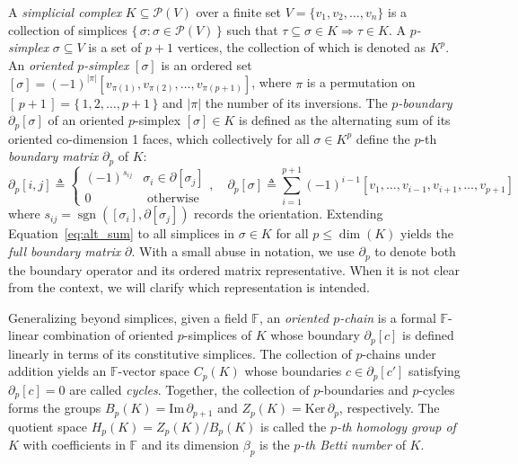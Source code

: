 \documentclass[pdflatex,sn-mathphys-num]{sn-jnl}
\begin{document}
A \emph{simplicial complex} \(K \subseteq \mathcal{P}(V)\) over a finite set \(V = \{ v_{1},v_{2},\ldots,v_{n}\}\) is a collection of simplices \(\{\,\sigma:\sigma \in \mathcal{P}(V)\,\}\) such that \(\tau \subseteq \sigma \in K \Rightarrow \tau \in K\). A \emph{\(p\)-simplex} \(\sigma \subseteq V\) is a set of \(p + 1\) vertices, the collection of which is denoted as \(K^{p}\). An \emph{oriented \(p\)-simplex} \( [\sigma] \) is an ordered set \( [\sigma]  = ( - 1)^{|\pi|} \left[ v_{\pi(1)},v_{\pi(2)},\ldots,v_{\pi(p + 1)} \right] \), where \(\pi\) is a permutation on \( [\, p + 1\,]  = \{\, 1,2,\ldots,p + 1\,\}\) and \(|\pi|\) the number of its inversions. The \emph{\(p\)-boundary} \(\partial_{p} [\sigma] \) of an oriented \(p\)-simplex \( [\sigma]  \in K\) is defined as the alternating sum of its oriented co-dimension 1 faces, which collectively for all \(\sigma \in K^{p}\) define the \(p\)-th \emph{boundary matrix} \(\partial_{p}\) of \(K\):
\begin{equation}
\partial_p[i, j] \triangleq 
\begin{cases}
(-1)^{s_{i j}} & \sigma_i \in \partial\left[\sigma_j\right] \\
0 & \text { otherwise }
\end{cases}, 
\quad \partial_p[\sigma] \triangleq \sum_{i=1}^{p+1}(-1)^{i-1} [v_1, \dots, v_{i-1}, v_{i+1}, \dots, v_{p+1}]
\end{equation}\label{eq:alt_sum}
\noindent
where \(s_{ij} = \operatorname{sgn} \left(  \left[ \sigma_{i} \right] ,\partial \left[ \sigma_{j} \right]  \right) \) records the orientation. Extending Equation~\ref{eq:alt_sum} to all simplices in \(\sigma \in K\) for all \(p \leq \dim(K)\) yields the \emph{full boundary matrix} \(\partial\). With a small abuse in notation, we use \(\partial_{p}\) to denote both the boundary operator and its ordered matrix representative. When it is not clear from the context, we will clarify which representation is intended.

Generalizing beyond simplices, given a field \(\mathbb{F}\), an \emph{oriented \(p\)-chain} is a formal \(\mathbb{F}\)-linear combination of oriented \(p\)-simplices of \(K\) whose boundary \(\partial_{p} [ c] \) is defined linearly in terms of its constitutive simplices. The collection of \(p\)-chains under addition yields an \(\mathbb{F}\)-vector space \(C_{p}(K)\) whose boundaries \(c \in \partial_{p} [ c'] \) satisfying \(\partial_{p} [c]  = 0\) are called \emph{cycles}. Together, the collection of \(p\)-boundaries and \(p\)-cycles forms the groups \(B_{p}(K) = \mathrm{Im}\,\partial_{p + 1}\) and \(Z_{p}(K) = \mathrm{Ker}\,\partial_{p}\), respectively. The quotient space \(H_{p}(K) = Z_{p}(K)/B_{p}(K)\) is called the \emph{\(p\)-th homology group of \(K\)} with coefficients in \(\mathbb{F}\) and its dimension \(\beta_{p}\) is the \emph{\(p\)-th Betti number} of \(K\).
\end{document}
